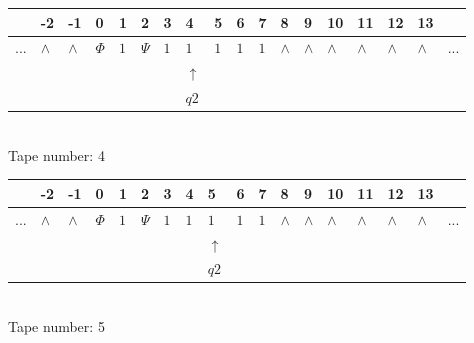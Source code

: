 \documentclass[11pt]{article}
\begin{document}
\begin{table}[H]
\centering
\begin{tabular}{llllllllllllllllll}
 & -2 & -1 & 0 & 1 & 2 & 3 & 4 & 5 & 6 & 7 & 8 & 9 & 10 & 11 & 12 & 13 & \\
\hline
$...$ & \multicolumn{1}{|l|}{$\wedge$} & \multicolumn{1}{|l|}{$\wedge$} & \multicolumn{1}{|l|}{$\Phi$} & \multicolumn{1}{|l|}{$1$} & \multicolumn{1}{|l|}{$\Psi$} & \multicolumn{1}{|l|}{$1$} & \multicolumn{1}{|l|}{$1$} & \multicolumn{1}{|l|}{$1$} & \multicolumn{1}{|l|}{$1$} & \multicolumn{1}{|l|}{$1$} & \multicolumn{1}{|l|}{$\wedge$} & \multicolumn{1}{|l|}{$\wedge$} & \multicolumn{1}{|l|}{$\wedge$} & \multicolumn{1}{|l|}{$\wedge$} & \multicolumn{1}{|l|}{$\wedge$} & \multicolumn{1}{|l|}{$\wedge$} & $...$\\
\hline
&  &  &  &  &  &  & $\uparrow$ &  &  &  &  &  &  &  &  &  &  \\
&  &  &  &  &  &  & $ q2 $ &  &  &  &  &  &  &  &  &  &  \\
\end{tabular}
\\
Tape number: 4
\noindent\makebox[\linewidth]{\hdashrule{\textwidth}{1pt}{1pt}}\end{table}

\begin{table}[H]
\centering
\begin{tabular}{llllllllllllllllll}
 & -2 & -1 & 0 & 1 & 2 & 3 & 4 & 5 & 6 & 7 & 8 & 9 & 10 & 11 & 12 & 13 & \\
\hline
$...$ & \multicolumn{1}{|l|}{$\wedge$} & \multicolumn{1}{|l|}{$\wedge$} & \multicolumn{1}{|l|}{$\Phi$} & \multicolumn{1}{|l|}{$1$} & \multicolumn{1}{|l|}{$\Psi$} & \multicolumn{1}{|l|}{$1$} & \multicolumn{1}{|l|}{$1$} & \multicolumn{1}{|l|}{$1$} & \multicolumn{1}{|l|}{$1$} & \multicolumn{1}{|l|}{$1$} & \multicolumn{1}{|l|}{$\wedge$} & \multicolumn{1}{|l|}{$\wedge$} & \multicolumn{1}{|l|}{$\wedge$} & \multicolumn{1}{|l|}{$\wedge$} & \multicolumn{1}{|l|}{$\wedge$} & \multicolumn{1}{|l|}{$\wedge$} & $...$\\
\hline
&  &  &  &  &  &  &  & $\uparrow$ &  &  &  &  &  &  &  &  &  \\
&  &  &  &  &  &  &  & $ q2 $ &  &  &  &  &  &  &  &  &  \\
\end{tabular}
\\
Tape number: 5
\noindent\makebox[\linewidth]{\hdashrule{\textwidth}{1pt}{1pt}}\end{table}
\clearpage
\end{document}
